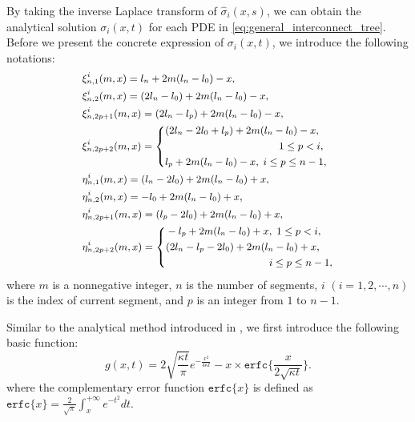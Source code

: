 By taking the inverse Laplace transform of $\hat{\sigma}_{i}(x,s)$, we
can obtain the analytical solution $\sigma_i(x,t)$ for each PDE in
\eqref{eq:general_interconnect_tree}. Before we present the concrete
expression of $\sigma_i(x,t)$, we introduce the following notations:
\begin{equation} \label{generalNotations}\small
\begin{split}
&\xi_{n,1}^{i}(m,x)=l_n+2m(l_n-l_0)-x,\\
&\xi_{n,2}^{i}(m,x)=(2l_n-l_0)+2m(l_n-l_0)-x,\\
&\xi_{n,2p+1}^{i}(m,x)=(2l_n-l_p)+2m(l_n-l_0)-x,\\
&\xi_{n,2p+2}^{i}(m,x)=\left\{
   \begin{aligned}
   &(2l_n-2l_0+l_p)+2m(l_n-l_0)-x,\;\\
   &\qquad\qquad\qquad\qquad\qquad\quad 1\leq p<i,  \\
   &l_p+2m(l_n-l_0)-x,\;i\leq p\leq n-1, \\
      \end{aligned}
   \right. \\
&\eta_{n,1}^{i}(m,x)=(l_n-2l_0)+2m(l_n-l_0)+x,\\
&\eta_{n,2}^{i}(m,x)=-l_0+2m(l_n-l_0)+x,\\
&\eta_{n,2p+1}^{i}(m,x)=(l_p-2l_0)+2m(l_n-l_0)+x,\\
&\eta_{n,2p+2}^{i}(m,x)=\left\{
   \begin{aligned}
   &-l_p+2m(l_n-l_0)+x,\;1\leq p<i,  \\
   &(2l_n-l_p-2l_0)+2m(l_n-l_0)+x,\; \\
   &\qquad\qquad\qquad\qquad\qquad i\leq p \leq n-1, \\
   \end{aligned}
   \right.
\end{split}
\end{equation}
where $m$ is a nonnegative integer, $n$ is the number of segments, $i$ $(i=1,2,\cdots,n)$ is the index of current segment, and $p$ is an integer from $1$ to $n-1$.

Similar to the analytical method introduced in
\cite{ChenHuang:DAC'15}, we first introduce the following basic
function:
\begin{equation} \label{general_basisFunc}
g(x,t)=2\sqrt{\frac{\kappa t}{\pi}}e^{-\frac{x^2}{4\kappa
t}}-x\times\texttt{erfc}\{\frac{x}{2\sqrt{\kappa t}}\}.
\end{equation}
where the complementary error function $\texttt{erfc}\{x\}$ is defined
as
$\texttt{erfc}\{x\}=\frac{2}{\sqrt{\pi}}\int_x^{+\infty}e^{-t^2}dt$.

